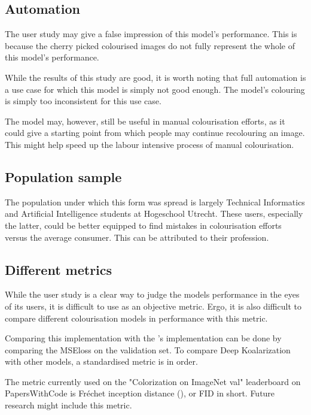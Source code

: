 \documentclass{article}
\begin{document}
    \subsection{Automation}
        The user study may give a false impression of this model's performance. This is because the cherry picked colourised images do not fully represent the whole of this model's performance.
        
        While the results of this study are good, it is worth noting that full automation is a use case for which this model is simply not good enough. The model's colouring is simply too inconsistent for this use case. 
        
        The model may, however, still be useful in manual colourisation efforts, as it could give a starting point from which people may continue recolouring an image. This might help speed up the labour intensive process of manual colourisation.

    \subsection{Population sample}
        The population under which this form was spread is largely Technical Informatics and Artificial Intelligence students at Hogeschool Utrecht. These users, especially the latter, could be better equipped to find mistakes in colourisation efforts versus the average consumer. This can be attributed to their profession. 
    
    \subsection{Different metrics}
        While the user study is a clear way to judge the models performance in the eyes of its users, it is difficult to use as an objective metric. Ergo, it is also difficult to compare different colourisation models in performance with this metric.
        
        Comparing this implementation with the \cite{deepkoal2017}'s implementation can be done by comparing the MSEloss on the validation set. To compare Deep Koalarization with other models, a standardised metric is in order.
        
        The metric currently used on the "Colorization on ImageNet val" leaderboard on PapersWithCode is Fréchet inception distance (\cite{heusel2017gans}), or FID in short. Future research might include this metric.
    
\end{document}
